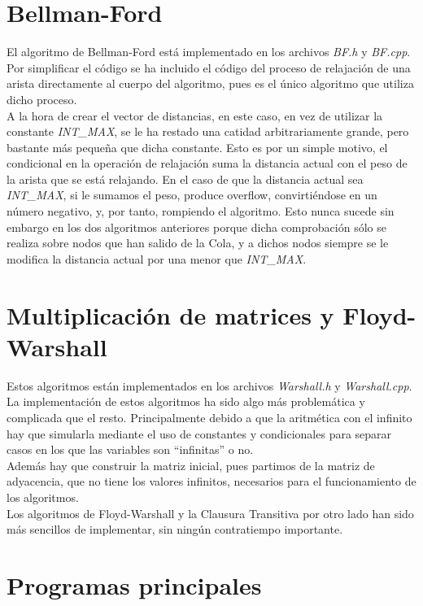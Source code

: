 \section{Bellman-Ford}

El algoritmo de Bellman-Ford está implementado en los archivos \textit{BF.h} y \textit{BF.cpp}. Por simplificar el código se ha incluido el código del proceso de relajación de una arista directamente al cuerpo del algoritmo, pues es el único algoritmo que utiliza dicho proceso. \\

A la hora de crear el vector de distancias, en este caso, en vez de utilizar la constante \textit{INT\_MAX}, se le ha restado una catidad arbitrariamente grande, pero bastante más pequeña que dicha constante. Esto es por un simple motivo, el condicional en la operación de relajación suma la distancia actual con el peso de la arista que se está relajando. En el caso de que la distancia actual sea \textit{INT\_MAX}, si le sumamos el peso, produce overflow, convirtiéndose en un número negativo, y, por tanto, rompiendo el algoritmo. Esto nunca sucede sin embargo en los dos algoritmos anteriores porque dicha comprobación sólo se realiza sobre nodos que han salido de la Cola, y a dichos nodos siempre se le modifica la distancia actual por una menor que \textit{INT\_MAX}.

\section{Multiplicación de matrices y Floyd-Warshall}

Estos algoritmos están implementados en los archivos \textit{Warshall.h} y \textit{Warshall.cpp}. La implementación de estos algoritmos ha sido algo más problemática y complicada que el resto. Principalmente debido a que la aritmética con el infinito hay que simularla mediante el uso de constantes y condicionales para separar casos en los que las variables son ``infinitas'' o no. \\

Además hay que construir la matriz inicial, pues partimos de la matriz de adyacencia, que no tiene los valores infinitos, necesarios para el funcionamiento de los algoritmos. \\

Los algoritmos de Floyd-Warshall y la Clausura Transitiva por otro lado han sido más sencillos de implementar, sin ningún contratiempo importante.

\section{Programas principales}

